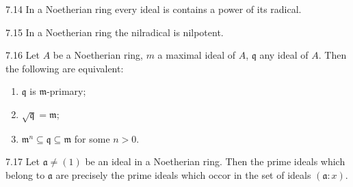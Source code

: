 \begin{proposition}{7.14}
	In a Noetherian ring every ideal is contains a power of its radical.
\end{proposition}

\begin{proposition}{7.15}
	In a Noetherian ring the nilradical is nilpotent.
\end{proposition}

\begin{proposition}{7.16}
	Let $A$ be a Noetherian ring, $m$ a maximal ideal of $A$, $\mathfrak{q}$ any ideal of $A$. Then the following are equivalent:
	\begin{enumerate}[label=\textup{(\roman*)}]
		\item $\mathfrak{q}$ is $\mathfrak{m}$-primary;
		\item $\sqrt{\mathfrak{q}}=\mathfrak{m}$;
		\item $\mathfrak{m}^n\subseteq\mathfrak{q}\subseteq\mathfrak{m}$ for some $n>0$.
	\end{enumerate}
\end{proposition}

\begin{proposition}{7.17}
	Let $\mathfrak{a}\neq(1)$ be an ideal in a Noetherian ring. Then the prime ideals which belong to $\mathfrak{a}$ are precisely the prime ideals which occor in the set of ideals $(\mathfrak{a}:x)$.
\end{proposition}